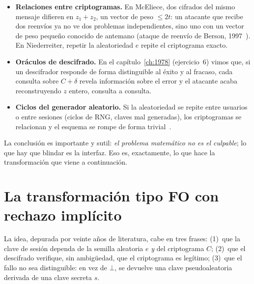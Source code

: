 \documentclass[11pt,a4paper,oneside]{report}
\begin{document}
\begin{itemize}[leftmargin=1.5em,itemsep=3pt]
  \item \textbf{Relaciones entre criptogramas.} En McEliece, dos
        cifrados del mismo mensaje difieren en $z_1+z_2$, un vector de
        peso $\le2t$: un atacante que recibe dos reenvíos ya no ve dos
        problemas independientes, sino uno con un vector de peso
        pequeño conocido de antemano (ataque de reenvío de Berson,
        1997~\cite{berson1997}). En Niederreiter, repetir la
        aleatoriedad $e$ repite el criptograma exacto.
  \item \textbf{Oráculos de descifrado.} En el capítulo~\ref{ch:1978}
        (ejercicio~6) vimos que, si un descifrador responde de forma
        distinguible al éxito y al fracaso, cada consulta sobre
        $C+\delta$ revela información sobre el error y el atacante
        acaba reconstruyendo $z$ entero, consulta a consulta.
  \item \textbf{Ciclos del generador aleatorio.} Si la aleatoriedad se
        repite entre usuarios o entre sesiones (ciclos de RNG, claves
        mal generadas), los criptogramas se relacionan y el esquema se
        rompe de forma trivial~\cite{cmsecurity}.
\end{itemize}

La conclusión es importante y sutil: \emph{el problema matemático no es
el culpable}; lo que hay que blindar es la interfaz. Eso es,
exactamente, lo que hace la transformación que viene a continuación.

\section{La transformación tipo FO con rechazo implícito}

La idea, depurada por veinte años de literatura, cabe en tres frases:
(1)~que la clave de sesión dependa de la semilla aleatoria $e$
\emph{y} del criptograma $C$; (2)~que el descifrado verifique, sin
ambigüedad, que el criptograma es legítimo; (3)~que el fallo no sea
distinguible: en vez de $\bot$, se devuelve una clave pseudoaleatoria
derivada de una clave secreta $s$.
\end{document}
